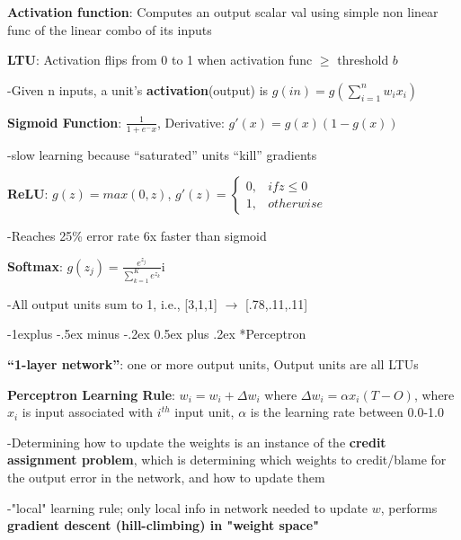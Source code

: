 \documentclass[10pt,landscape]{article}
\makeatletter
\renewcommand{\subsection}{\@startsection{subsection}{2}{0mm}%
                                {-1explus -.5ex minus -.2ex}%
                                {0.5ex plus .2ex}%
                                {\normalfont\footnotesize\bfseries}}
\makeatother
\begin{document}
\begin{multicols}{3}
\textbf{Activation function}: Computes an output scalar val using simple non linear func of the linear combo of its inputs

\textbf{LTU}: Activation flips from 0 to 1 when activation func $\ge$ threshold $b$

-Given n inputs, a unit's \textbf{activation}(output) is $g(in) = g(\sum_{i=1}^{n} w_i x_i)$

\textbf{Sigmoid Function}: $\frac{1}{1+e^-x}$, Derivative: $g'(x) = g(x)(1-g(x))$

-slow learning because ``saturated'' units ``kill'' gradients

\textbf{ReLU}: $g(z) = max(0,z)$, $g'(z) = \begin{cases} 0, & if z \le 0\\1, & otherwise\end{cases}$

-Reaches 25\% error rate 6x faster than sigmoid

\textbf{Softmax}: $g(z_j) = \frac{e^{z_j}}{\sum_{k=1}^{K}e^{z_k}}$i

-All output units sum to 1, i.e., [3,1,1] $\to$ [.78,.11,.11]

\subsection{*Perceptron}

\textbf{``1-layer network''}: one or more output units, Output units are all LTUs

\textbf{Perceptron Learning Rule}: $w_i = w_i + \Delta w_i$ where $\Delta w_i = \alpha x_i(T-O)$, where $x_i$ is input associated with $i^{th}$ input unit, $\alpha$ is the learning rate between 0.0-1.0

-Determining how to update the weights is an instance of the \textbf{credit assignment problem}, which is determining which weights to credit/blame for the output error in the network, and how to update them

-"local" learning rule; only local info in network needed to update $w$, performs \textbf{gradient descent (hill-climbing) in "weight space"}


\end{multicols}
\end{document}
